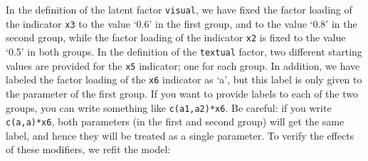 In the definition of the latent factor \texttt{visual}, we have fixed
the factor loading of the indicator \texttt{x3} to the value `0.6' in
the first group, and to the value `0.8' in the second group, while the
factor loading of the indicator \texttt{x2} is fixed to the value `0.5'
in both groups. In the definition of the \texttt{textual} factor, two
different starting values are provided for the \texttt{x5} indicator;
one for each group. In addition, we have labeled the factor loading of
the \texttt{x6} indicator as `a', but this label is only given to the
parameter of the first group. If you want to provide labels to each of
the two groups, you can write something like \texttt{c(a1,a2)*x6}. Be
careful: if you write \texttt{c(a,a)*x6}, both parameters (in the first
and second group) will get the same label, and hence they will be
treated as a single parameter. To verify the effects of these modifiers,
we refit the model:

\begin{Shaded}
\begin{Highlighting}[]
\StringTok{ }
            
            \NormalTok{)}
\end{Highlighting}
\end{Shaded}

